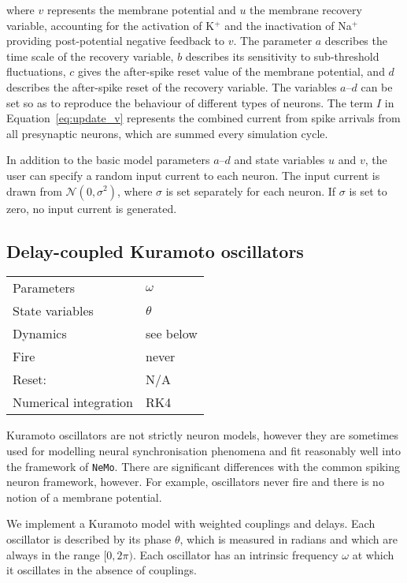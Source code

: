 \documentclass[a4paper]{article}
\newcommand{\nemo}{\texttt{NeMo}}
\begin{document}
where $v$ represents the membrane potential
	and $u$ the membrane recovery variable,
	accounting for the activation of K$^+$
	and the inactivation of Na$^+$ 
	providing post-potential negative feedback to $v$.
The parameter $a$ describes the time scale of the recovery variable, 
	$b$ describes its sensitivity to sub-threshold fluctuations, 
	$c$ gives the after-spike reset value of the membrane potential, 
	and $d$ describes the after-spike reset of the recovery variable. 
The variables $a$--$d$ can be set so as to reproduce the behaviour of different types of neurons.
The term $I$ in Equation~\ref{eq:update_v} represents the combined 
	current from spike arrivals from all presynaptic neurons,
	which are summed every simulation cycle.

In addition to the basic model parameters $a$--$d$ and state variables $u$ and $v$,
	the user can specify a random input current to each neuron. 
The input current is drawn from $\mathcal{N}(0, \sigma^2)$,
	where $\sigma$ is set separately for each neuron.
If $\sigma$ is set to zero, no input current is generated.

\subsection{Delay-coupled Kuramoto oscillators}
\label{model:neuron:kuramoto}

\begin{tabular}{ll}
Parameters      & $\omega$ \\ 
State variables & $\theta$ \\
Dynamics        & see below \\
Fire            & never \\
Reset:          & N/A \\
Numerical integration & RK4 \\
\end{tabular}

Kuramoto oscillators are not strictly neuron models,
	however they are sometimes used for modelling neural synchronisation phenomena
	and fit reasonably well into the framework of \nemo.
There are significant differences with the common spiking neuron framework, however.
For example, oscillators never fire and there is no notion of a membrane potential.

We implement a Kuramoto model with weighted couplings and delays. 
Each oscillator is described by its phase $\theta$,
	which is measured in radians and which are always in the range $[0, 2\pi)$.
Each oscillator has an intrinsic frequency $\omega$ at which it oscillates in the
absence of couplings.
\end{document}
